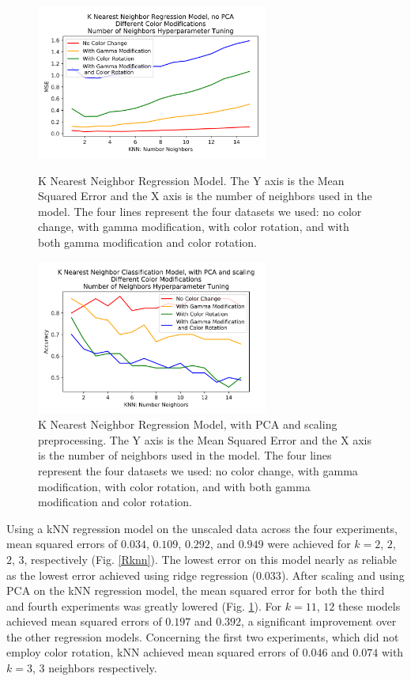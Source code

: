 \documentclass[journal]{IEEEtran}
\begin{document}
\begin{figure}
\centering
\includegraphics[height=2in]{KNN_reg_noPCA/knn_regression.png}
\caption{K Nearest Neighbor Regression Model. The Y axis is the Mean Squared Error and the X axis is the number of neighbors used in the model. The four lines represent the four datasets we used: no color change, with gamma modification, with color rotation, and with both gamma modification and color rotation.}
\label{Rknn}

\centering
\includegraphics[height=2in]{KNN_clf_PCA/knn_classification.png}
\caption{K Nearest Neighbor Regression Model, with PCA and scaling preprocessing. The Y axis is the Mean Squared Error and the X axis is the number of neighbors used in the model. The four lines represent the four datasets we used: no color change, with gamma modification, with color rotation, and with both gamma modification and color rotation.}
\label{Rknn_pca}
\end{figure}

Using a kNN regression model on the unscaled data across the four experiments, mean squared errors of $0.034$, $0.109$, $0.292$, and $0.949$ were achieved for $k=2$, $2$, $2$, $3$, respectively (Fig. \ref{Rknn}). The lowest error on this model nearly as reliable as the lowest error achieved using ridge regression ($0.033$). After scaling and using PCA on the kNN regression model, the mean squared error for both the third and fourth experiments was greatly lowered (Fig. \ref{Rknn_pca}). For $k=11$, $12$ these models achieved mean squared errors of $0.197$ and $0.392$, a significant improvement over the other regression models. Concerning the first two experiments, which did not employ color rotation, kNN achieved mean squared errors of $0.046$ and $0.074$ with $k=3$, $3$ neighbors respectively.
\end{document}
